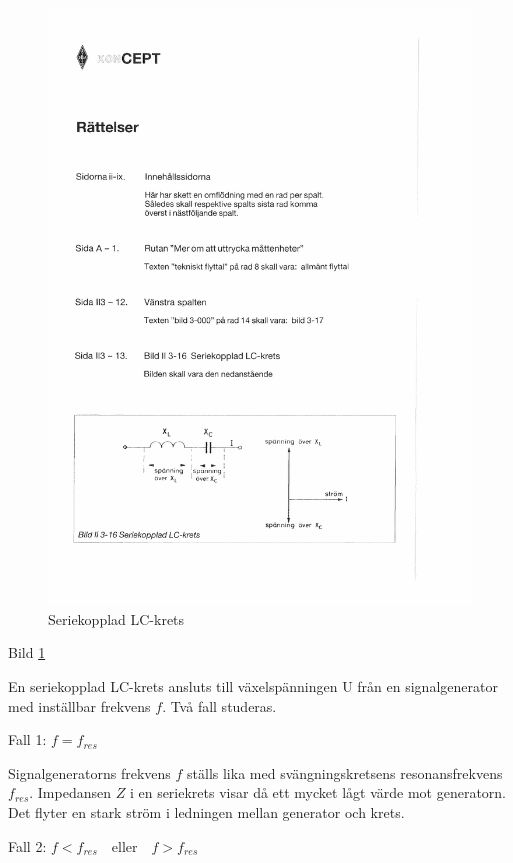 \begin{figure}
\includegraphics[width=\textwidth]{images/bild_2_3-16}
\caption{Seriekopplad LC-krets}
\label{fig:BildII3-16}
\end{figure}

Bild \ref{fig:BildII3-16}

En seriekopplad LC-krets ansluts till växelspänningen U från en signalgenerator
med inställbar frekvens \(f\). Två fall studeras.

Fall 1: \(f = f_{res}\)

Signalgeneratorns frekvens \(f\) ställs lika med svängningskretsens
resonansfrekvens \(f_{res}\). Impedansen \(Z\) i en seriekrets visar då ett
mycket lågt värde mot generatorn. Det flyter en stark ström i ledningen mellan
generator och krets.

Fall 2: \(f < f_{res} \quad \text{eller} \quad f > f_{res}\)

